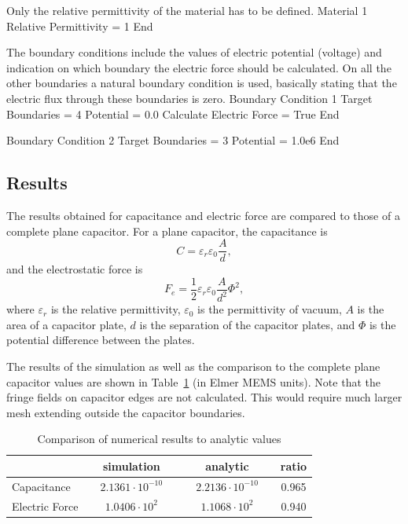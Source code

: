 Only the relative permittivity of the material has to be defined.
\ttbegin
Material 1
  Relative Permittivity = 1
End
\ttend

The boundary conditions include the values of electric potential
(voltage) and indication on which boundary the electric force should
be calculated. On all the other boundaries a natural boundary
condition is used, basically stating that the electric flux through
these boundaries is zero.
\ttbegin
Boundary Condition 1
  Target Boundaries = 4
  Potential = 0.0
  Calculate Electric Force = True
End

Boundary Condition 2
  Target Boundaries = 3
  Potential = 1.0e6
End
\ttend


\subsection*{Results}

The results obtained for capacitance and electric force are compared
to those of a complete plane capacitor. For a plane capacitor, the
capacitance is
\begin{equation}
C=\varepsilon_r\varepsilon_0\frac{A}{d},
\end{equation}
and the electrostatic force is
\begin{equation}
F_e = \frac{1}{2}\varepsilon_r\varepsilon_0\frac{A}{d^2}\Phi^2,
\end{equation}
where $\varepsilon_r$ is the relative permittivity, $\varepsilon_0$
is the permittivity of vacuum, $A$ is the area of a capacitor plate,
$d$ is the separation of the capacitor plates, and $\Phi$ is the
potential difference between the plates.

The results of the simulation as well as the comparison to the
complete plane capacitor values are shown in Table~\ref{tab_elstatics}
(in Elmer MEMS units). Note that the fringe fields on capacitor edges
are not calculated. This would require much larger mesh extending
outside the capacitor boundaries.

\begin{table}[htb]
\caption{Comparison of numerical results to analytic values}
\label{tab_elstatics}
\begin{center}
\begin{tabular}{lccc} \hline
            & simulation & analytic & ratio \\ \hline
Capacitance & \ \ $2.1361\cdot 10^{-10}$\ \  & 
              \ \ $2.2136\cdot 10^{-10}$\ \  & 0.965 \\
Electric Force & $1.0406\cdot 10^2$ & 
                 $1.1068\cdot 10^2$ & 0.940 \\ \hline
\end{tabular}
\end{center}
\end{table}

